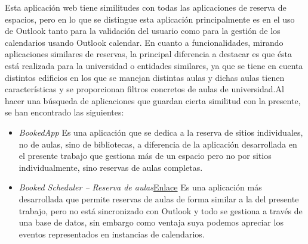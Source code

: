 
Esta aplicación web tiene similitudes con todas las aplicaciones de reserva de espacios, pero en lo que se distingue esta aplicación principalmente es en el uso de Outlook tanto para la validación del usuario como para la gestión de los calendarios usando Outlook calendar.\newline
En cuanto a funcionalidades, mirando aplicaciones similares de reservas, la principal diferencia a destacar es que ésta está realizada para la universidad o entidades similares, ya que se tiene en cuenta distintos edificios en los que se manejan distintas aulas y dichas aulas tienen características y se proporcionan filtros concretos de aulas de universidad.\newline Al hacer una búsqueda de aplicaciones que guardan cierta  similitud con la presente, se han encontrado las siguientes:
\begin{itemize}
    \item \textit{BookedApp}\newline 
    Es una aplicación que se dedica a la reserva de sitios individuales, no de aulas, sino de bibliotecas, a diferencia de la aplicación desarrollada en el presente trabajo que gestiona más de un espacio pero no por sitios individualmente, sino reservas de aulas completas. \cite{BookedApp}
    \item  \textit{Booked Scheduler – Reserva de aulas}\href{https://valentingom.wordpress.com/2016/07/10/booked-scheduler-reservas/}{Enlace}\cite{BookedScheduler} \newline
    Es una aplicación más desarrollada que permite reservas de aulas de forma similar a la del presente trabajo, pero no está sincronizado con Outlook y todo se gestiona a través de una base de datos, sin embargo como ventaja suya podemos apreciar los eventos representados en instancias de calendarios.
\end{itemize}


